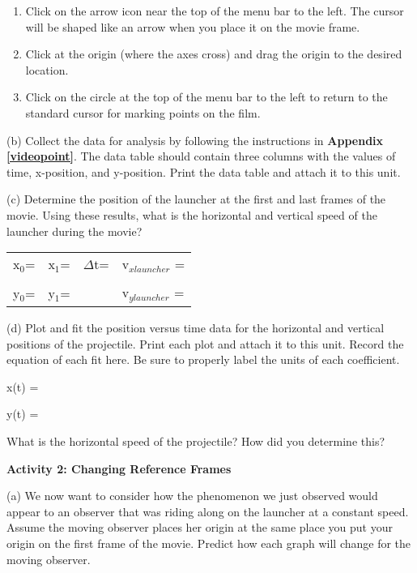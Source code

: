 \begin{enumerate}
\item Click on the arrow icon near the top of the menu bar to the left.
The cursor will be shaped like an arrow when you place it on the movie
frame.
\item Click at the origin (where the axes cross) and drag the origin to
the desired location.
\item Click on the circle at the top of the menu bar to the left to return
to the standard cursor for marking points on the film.
\end{enumerate}
(b) Collect the data for analysis by following the instructions in
\textbf{Appendix \ref{videopoint}}. The data table should contain three columns with
the values of time, x-position, and y-position. Print the data table
and attach it to this unit.

(c) Determine the position of the launcher at the first and last frames
of the movie. Using these results, what is the horizontal and vertical
speed of the launcher during the movie?

\vspace{0.3cm}
{\centering \begin{tabular}{p{20mm}p{20mm}p{30mm}p{70mm}}
x\( _{0} \)= &
x\( _{1} \)=&
\( \Delta  \)t=&
v\( _{xlauncher} \) =\\
&
&
&
\\
y\( _{0} \)=&
y\( _{1} \)= &
&
v\( _{ylauncher} \) =\\
\end{tabular}\par}
\vspace{0.3cm}

(d) Plot and fit the position versus time data for the horizontal
and vertical positions of the projectile. Print each
plot and attach it to this unit. Record the equation of each fit here.
Be sure to properly label the units of each coefficient.

x(t) =
\vspace*{5mm}

y(t) =
\vspace{5mm}

What is the horizontal speed of the projectile? How did you determine
this?
\vspace{2in}

\textbf{Activity 2: Changing Reference Frames}

(a) We now want to consider how the phenomenon we just observed would
appear to an observer that was riding along on the launcher at a constant
speed. Assume the moving observer places her origin at the same place
you put your origin on the first frame of the movie. Predict how each
graph will change for the moving observer.

